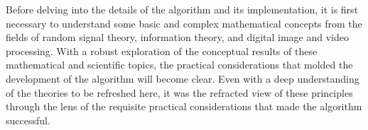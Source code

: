%
%
%
%
%
%

%
%
%

Before delving into the details of the algorithm and its implementation, it is first necessary to understand some basic and complex mathematical concepts from the fields of random signal theory, information theory, and digital image and video processing. With a robust exploration of the conceptual results of these mathematical and scientific topics, the practical considerations that molded the development of the algorithm will become clear. Even with a deep understanding of the theories to be refreshed here, it was the refracted view of these principles through the lens of the requisite practical considerations that made the algorithm successful.


